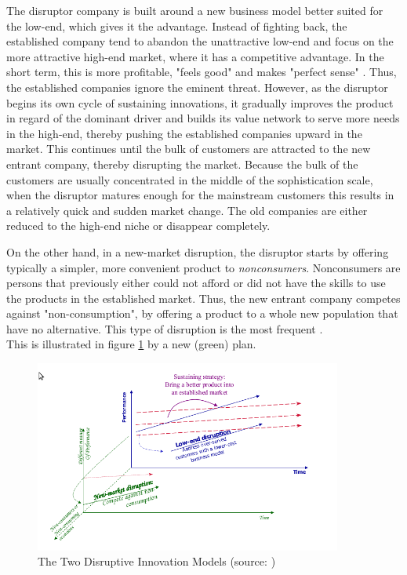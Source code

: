 \documentclass[a4paper,10pt]{book}
\begin{document}
The disruptor company is built around a new business model better suited for the low-end, which gives it the advantage.  
Instead of fighting back, the established company tend to abandon the unattractive low-end and focus on the more attractive high-end market, where it has
a competitive advantage. In the short term, this is more profitable, "feels good" and makes "perfect sense" \cite{innovatorsSolution}. 
Thus, the established companies ignore the eminent threat. 
However, as the disruptor begins its own cycle of sustaining innovations, it gradually improves the product in regard of the dominant driver 
and builds its value network to serve more needs in the high-end, 
thereby pushing the established companies upward in the market. 
This continues until the bulk of customers are 
attracted to the new entrant company, thereby disrupting the market. Because the bulk of the customers are usually concentrated in the 
middle of the sophistication scale, when the disruptor matures enough for the mainstream customers this results in a relatively 
quick and sudden market change. The old companies are either reduced to the high-end niche or disappear completely.


On the other hand, in a new-market disruption, the disruptor starts by offering 
typically a simpler, more convenient product to \emph{nonconsumers}.
Nonconsumers are persons that previously either could not afford or did not have the skills to use the products in the established 
market.
Thus, the new entrant company competes against "non-consumption", by offering a product to a whole new population that have no alternative. 
This type of disruption is the most frequent \cite{disruptionInEducation}. \\
This is illustrated in figure \ref{fig:twoDisruptiveInnovationModels} by a new (green) plan.

\begin{figure}[here]
\includegraphics[width=0.9\textwidth]{images/twoDiruptiveInnovationModels.png}
 \caption{The Two Disruptive Innovation Models (source: \cite{innovatorsSolution})}
\label{fig:twoDisruptiveInnovationModels}
\end{figure}
\end{document}
